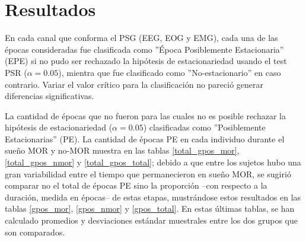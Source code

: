 \chapter{Resultados}

En cada canal que conforma el PSG (EEG, EOG y EMG), 
cada una de las \'epocas consideradas fue clasificada como 
''\'Epoca Posiblemente Estacionaria'' (EPE) si no pudo ser rechazado la hip\'otesis de 
estacionariedad usando el test PSR ($\alpha = 0.05$), mientra que 
fue clasificado como ''No-estacionario'' en caso contrario. Variar el valor cr\'itico
para la clasificaci\'on no pareci\'o generar diferencias significativas.

La cantidad de \'epocas que no fueron para las cuales no es posible rechazar la hip\'otesis de
estacionariedad ($\alpha=0.05$)
clasificadas como ''Posiblemente Estacionarias'' (PE). 
La cantidad de \'epocas PE en cada individuo %
durante el sue\~no MOR y no-MOR
muestra en las tablas \ref{total_gpos_mor}, \ref{total_gpos_nmor} y
\ref{total_gpos_total}; debido a que entre los sujetos hubo una gran variabilidad entre el tiempo 
que permanecieron en sue\~no MOR, se sugiri\'o comparar no el total de \'epocas PE sino
la proporci\'on --con respecto a la duraci\'on, medida en \'epocas-- de estas etapas, 
mustr\'andose estos resultados en las tablas \ref{gpos_mor}, \ref{gpos_nmor} y
\ref{gpos_total}. En estas \'ultimas tablas, se han calculado promedios y desviaciones
est\'andar muestrales entre los dos grupos que son comparados.


